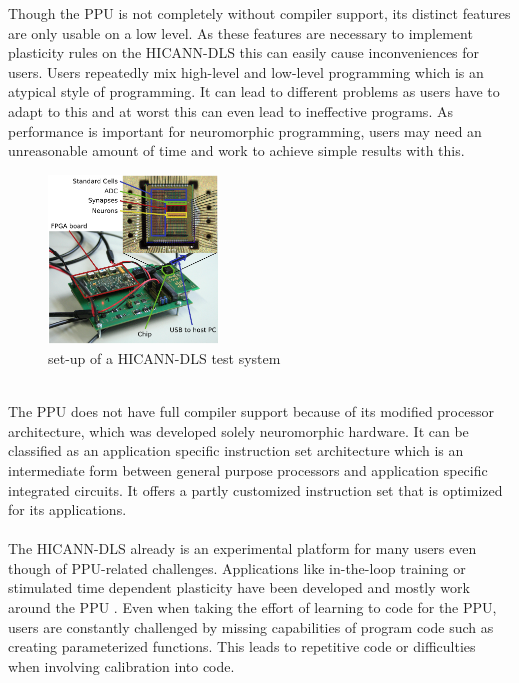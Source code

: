 Though the PPU is not completely without compiler support, its distinct features are only usable on a low level.
As these features are necessary to implement plasticity rules on the HICANN-DLS this can easily cause inconveniences for users.
Users repeatedly mix high-level and low-level programming which is an atypical style of programming.
It can lead to different problems as users have to adapt to this and at worst this can even lead to ineffective programs.
As performance is important for neuromorphic programming, users may need an unreasonable amount of time and work to achieve simple results with this.
\\
\begin{figure}
    \centering
    \includegraphics[width=0.4\textwidth]{pictures/Fig1.png}
    \caption{\label{fig:dlsboard} set-up of a HICANN-DLS test system}
\end{figure}
\\
The PPU does not have full compiler support because of its modified processor architecture, which was developed solely neuromorphic hardware.
It can be classified as an application specific instruction set architecture which is an intermediate form between general purpose processors and application specific integrated circuits.
It offers a partly customized instruction set that is optimized for its applications.
\\
\\
The HICANN-DLS already is an experimental platform for many users even though of PPU-related challenges.
Applications like in-the-loop training or stimulated time dependent plasticity have been developed and mostly work around the PPU .
Even when taking the effort of learning to code for the PPU, users are constantly challenged by missing capabilities of program code such as creating parameterized functions.
This leads to repetitive code or difficulties when involving calibration into code.

